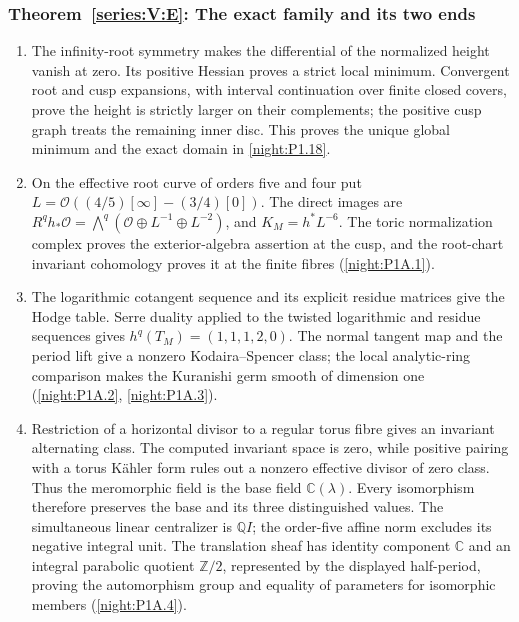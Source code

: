 \documentclass[11pt,a4paper]{article}
\numberwithin{equation}{section}
\theoremstyle{definition}
\begin{document}
\hypertarget{outline-V-E}{}
\subsubsection*{Theorem~\ref{series:V:E}: The exact family and its two ends}
\begin{enumerate}[label=\arabic*.,leftmargin=*]
\item\hypertarget{step-V-E-1}{} The infinity-root symmetry makes the differential of the normalized height vanish at zero. Its positive Hessian proves a strict local minimum. Convergent root and cusp expansions, with interval continuation over finite closed covers, prove the height is strictly larger on their complements; the positive cusp graph treats the remaining inner disc. This proves the unique global minimum and the exact domain in \cref{night:P1.18}.

\item\hypertarget{step-V-E-2}{} On the effective root curve of orders five and four put
  $L=\mathcal O((4/5)[\infty]-(3/4)[0])$.  The direct images are
  $R^qh_*\mathcal O=\bigwedge^q
  (\mathcal O\oplus L^{-1}\oplus L^{-2})$, and
  $K_M=h^*L^{-6}$.  The toric normalization complex proves the
  exterior-algebra assertion at the cusp, and the root-chart
  invariant cohomology proves it at the finite fibres
  (\cref{night:P1A.1}).

\item\hypertarget{step-V-E-3}{} The logarithmic cotangent sequence and its explicit residue
  matrices give the Hodge table.  Serre duality applied to
  the twisted logarithmic and residue sequences gives
  $h^q(T_M)=(1,1,1,2,0)$.  The normal tangent map and the period lift give a nonzero Kodaira--Spencer class; the local
  analytic-ring comparison makes the Kuranishi germ smooth of
  dimension one (\cref{night:P1A.2}, \cref{night:P1A.3}).

\item\hypertarget{step-V-E-4}{} Restriction of a horizontal divisor to a regular torus fibre
  gives an invariant alternating class.  The computed invariant
  space is zero, while positive pairing with a torus Kähler form
  rules out a nonzero effective divisor of zero class.  Thus the
  meromorphic field is the base field $\mathbb C(\lambda)$.
  Every isomorphism therefore preserves the base and its three
  distinguished values.  The simultaneous linear centralizer is
  $\mathbb Q I$; the order-five affine norm excludes its negative
  integral unit.  The translation sheaf has identity component
  $\mathbb C$ and an integral parabolic quotient $\mathbb Z/2$,
  represented by the displayed half-period, proving the
  automorphism group and equality of parameters for isomorphic
  members (\cref{night:P1A.4}).


\end{enumerate}
\end{document}
